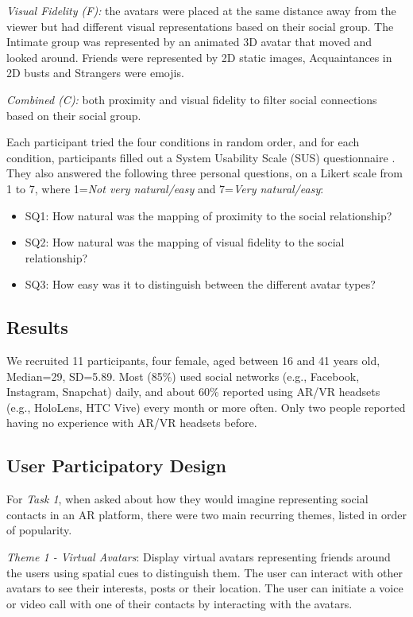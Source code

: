 \textit{Visual Fidelity (F):} the avatars were placed at the same distance away from the viewer but had different visual representations based on their social group. The Intimate group was represented by an animated 3D avatar that moved and looked around. Friends were represented by 2D static images, Acquaintances in 2D busts and Strangers were emojis.

\textit{Combined (C):} both proximity and visual fidelity to filter social connections based on their social group.

Each participant tried the four conditions in random order, and for each condition, participants filled out a System Usability Scale (SUS) questionnaire \cite{brooke1996sus}. They also answered the following three personal questions, on a Likert scale from 1 to 7, where 1=\textit{Not very natural/easy} and 7=\textit{Very natural/easy}:

\begin{itemize}
    \item SQ1: How natural was the mapping of proximity to the social relationship?
    \item SQ2: How natural was the mapping of visual fidelity to the social relationship?
    \item SQ3: How easy was it to distinguish between the different avatar types?
\end{itemize}

\subsection{Results}

We recruited 11 participants, four female, aged between 16 and 41 years old, Median=29, SD=5.89. Most (85\%) used social networks (e.g., Facebook, Instagram, Snapchat) daily, and about 60\% reported using AR/VR headsets (e.g., HoloLens, HTC Vive) every month or more often. Only two people reported having no experience with AR/VR headsets before.

\subsection{User Participatory Design}

For \textit{Task 1}, when asked about how they would imagine representing social contacts in an AR platform, there were two main recurring themes, listed in order of popularity.

\textit{Theme 1 - Virtual Avatars}: Display virtual avatars representing friends around the users using spatial cues to distinguish them. The user can interact with other avatars to see their interests, posts or their location. The user can initiate a voice or video call with one of their contacts by interacting with the avatars.

